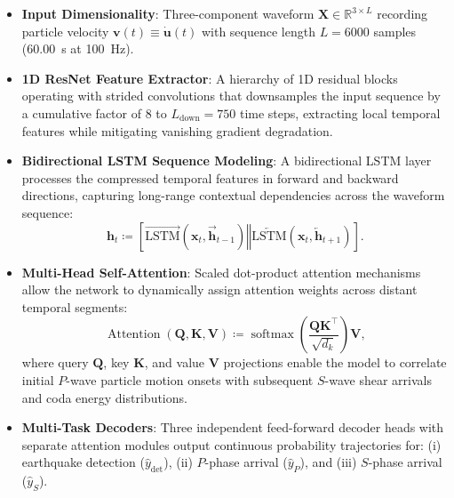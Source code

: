 \begin{itemize}
  \item \textbf{Input Dimensionality}: Three-component waveform
    $\mathbf{X} \in \mathbb{R}^{3 \times L}$ recording particle velocity
    $\mathbf{v}(t) \equiv \dot{\mathbf{u}}(t)$
    with sequence length $L = \num{6000}$ samples
    (\qty{60.00}{\second} at \qty{100}{\hertz}).
  \item \textbf{1D ResNet Feature Extractor}: A hierarchy of 1D residual blocks
    operating with strided convolutions that downsamples the input
    sequence by a
    cumulative factor of \num{8} to $L_{\mathrm{down}} = \num{750}$
    time steps, extracting
    local temporal features while mitigating vanishing gradient degradation.
  \item \textbf{Bidirectional LSTM Sequence Modeling}: A
    bidirectional LSTM layer
    processes the compressed temporal features in forward and
    backward directions,
    capturing long-range contextual dependencies across the waveform sequence:
    \begin{equation}
      \mathbf{h}_t \coloneqq \left[
        \overrightarrow{\mathrm{LSTM}}(\mathbf{x}_t,
        \overrightarrow{\mathbf{h}}_{t-1}) \mathbin{\Vert}
        \overleftarrow{\mathrm{LSTM}}(\mathbf{x}_t,
      \overleftarrow{\mathbf{h}}_{t+1}) \right].
    \end{equation}
  \item \textbf{Multi-Head Self-Attention}: Scaled dot-product attention
    mechanisms allow the network to dynamically assign attention weights across
    distant temporal segments:
    \begin{equation}
      \operatorname{Attention}(\mathbf{Q}, \mathbf{K}, \mathbf{V}) \coloneqq
      \operatorname{softmax}\left(
      \frac{\mathbf{Q}\mathbf{K}^\top}{\sqrt{d_k}} \right)\mathbf{V},
    \end{equation}
    where query $\mathbf{Q}$, key $\mathbf{K}$, and value
    $\mathbf{V}$ projections
    enable the model to correlate initial $P$-wave particle motion
    onsets with subsequent
    $S$-wave shear arrivals and coda energy distributions.
  \item \textbf{Multi-Task Decoders}: Three independent feed-forward
    decoder heads
    with separate attention modules output continuous probability
    trajectories for:
    (i) earthquake detection ($\hat{y}_{\mathrm{det}}$), (ii) $P$-phase arrival
    ($\hat{y}_P$), and (iii) $S$-phase arrival ($\hat{y}_S$).
\end{itemize}

